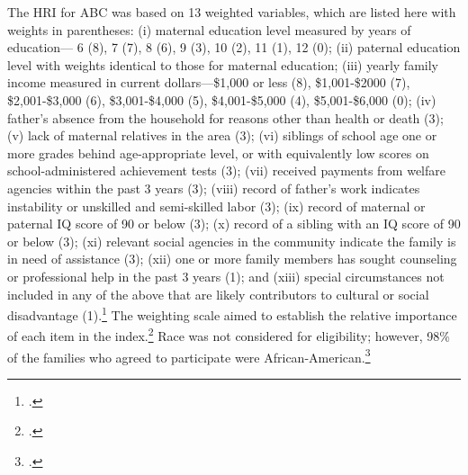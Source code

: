 \begin{appendices}
\noindent The HRI for ABC was based on 13 weighted variables, which are listed here with weights in parentheses: (i) maternal education level measured by years of education--- 6 (8), 7 (7), 8 (6), 9 (3), 10 (2), 11 (1), 12 (0); (ii) paternal education level with weights identical to those for maternal education; (iii) yearly family income measured in current dollars---\$1,000 or less (8), \$1,001-\$2000 (7), \$2,001-\$3,000 (6), \$3,001-\$4,000 (5), \$4,001-\$5,000 (4), \$5,001-\$6,000 (0); (iv) father's absence from the household for reasons other than health or death (3); (v) lack of maternal relatives in the area (3); (vi) siblings of school age one or more grades behind age-appropriate level, or with equivalently low scores on school-administered achievement tests (3); (vii) received payments from welfare agencies within the past 3 years (3); (viii) record of father's work indicates instability or unskilled and semi-skilled labor (3); (ix) record of maternal or paternal IQ score of 90 or below (3); (x) record of a sibling with an IQ score of 90 or below (3); (xi) relevant social agencies in the community indicate the family is in need of assistance (3); (xii) one or more family members has sought counseling or professional help in the past 3 years (1); and (xiii) special circumstances not included in any of the above that are likely contributors to cultural or social disadvantage (1).\footnote{\citet{Ramey_Smith_1977_AJMD, Ramey_Campbell_1984_AJMD,Ramey_Campbell_1991_childreninpoverty,Ramey_Campbell_etal_2000_ADS}.} The weighting scale aimed to establish the relative importance of each item in the index.\footnote{\citet{Ramey_Smith_1977_AJMD}.} Race was not  considered for eligibility; however, 98\% of the families who agreed to participate were African-American.\footnote{\citet{Ramey_Smith_1977_AJMD,Ramey_Campbell_1979_SR}.} \\


\end{appendices}
